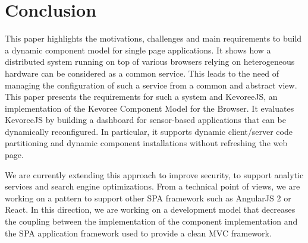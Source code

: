 \section{Conclusion}
This paper highlights the motivations, challenges and main requirements to build a dynamic component model for single page applications. It shows how a distributed system running on top of various browsers relying on heterogeneous hardware can be considered as a common service. This leads to the need of managing the configuration of such a service from a common and abstract view. This paper presents the requirements for such a system and KevoreeJS, an implementation of the Kevoree Component Model for the Browser. It evaluates KevoreeJS by building a dashboard for sensor-based applications that can be dynamically reconfigured. In particular, it supports dynamic client/server code partitioning and dynamic component installations without refreshing the web page.

We are currently extending this approach to improve security, to support analytic services and search engine optimizations. From a technical point of views, we are working on a pattern to support other SPA framework such as AngularJS 2 or React. In this direction, we are working on a development model that decreases the coupling between the implementation of the component implementation and the SPA application framework used to provide a clean MVC framework.  %
